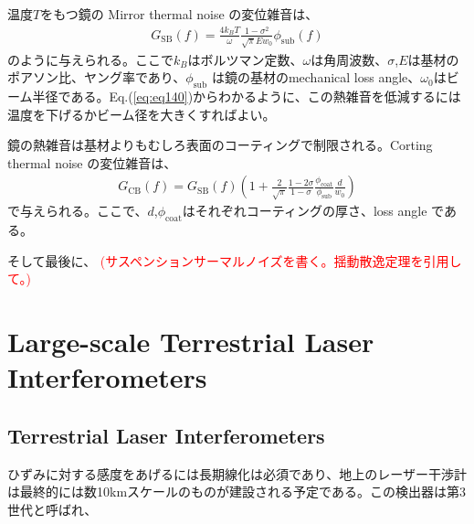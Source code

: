 温度$T$をもつ鏡の Mirror thermal noise の変位雑音は、
\begin{eqnarray}
  G_{\mathrm{SB}}(f)=\frac{4 k_{B} T}{\omega} \frac{1-\sigma^{2}}{\sqrt{\pi} E w_{0}} \phi_{\mathrm{sub}}(f)
  \label{eq:eq140}
\end{eqnarray}
のように与えられる\cite{levin1998internal,numata2003wide}。ここで$k_{B}$はボルツマン定数、$\omega$は角周波数、$\sigma$,$E$は基材のポアソン比、ヤング率であり、$\phi_{\mathrm{sub}}$ は鏡の基材のmechanical loss angle、$\omega_0$はビーム半径である。Eq.(\ref{eq:eq140})からわかるように、この熱雑音を低減するには温度を下げるかビーム径を大きくすればよい。

鏡の熱雑音は基材よりもむしろ表面のコーティングで制限される。Corting thermal noise の変位雑音は、
\begin{eqnarray}
G_{\mathrm{CB}}(f)=G_{\mathrm{SB}}(f)\left(1+\frac{2}{\sqrt{\pi}} \frac{1-2 \sigma}{1-\sigma} \frac{\phi_{\mathrm{coat}}}{\phi_{\mathrm{sub}}} \frac{d}{w_{0}}\right)
\end{eqnarray}
で与えられる\cite{numata2003wide,harry2002thermal}。ここで、$d$,$\phi_{\mathrm{coat}}$はそれぞれコーティングの厚さ、loss angle である。

そして最後に、
\textcolor{red}{(サスペンションサーマルノイズを書く。揺動散逸定理を引用して。)}

\section{Large-scale Terrestrial Laser Interferometers}
\subsection{Terrestrial Laser Interferometers}
ひずみに対する感度をあげるには長期線化は必須であり、地上のレーザー干渉計は最終的には数10kmスケールのものが建設される予定である\cite{}。この検出器は第3世代と呼ばれ、

